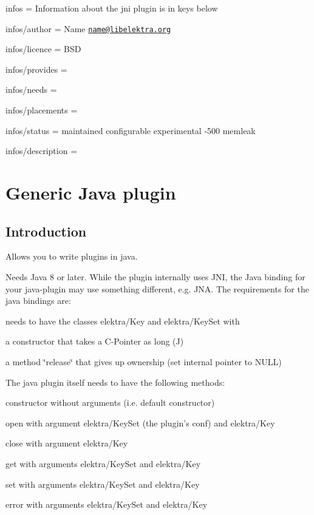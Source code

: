 
\begin{DoxyItemize}
\item infos = Information about the jni plugin is in keys below
\item infos/author = Name \href{mailto:name@libelektra.org}{\tt name@libelektra.\+org}
\item infos/licence = B\+S\+D
\item infos/provides =
\item infos/needs =
\item infos/placements =
\item infos/status = maintained configurable experimental -\/500 memleak
\item infos/description =
\end{DoxyItemize}\hypertarget{md_src_plugins_jni_README_src_plugins_jni_README_md}{}\section{Generic Java plugin}\label{md_src_plugins_jni_README_src_plugins_jni_README_md}
\subsection*{Introduction}

Allows you to write plugins in java.

Needs Java 8 or later. While the plugin internally uses J\+N\+I, the Java binding for your java-\/plugin may use something different, e.\+g. J\+N\+A. The requirements for the java bindings are\+:


\begin{DoxyItemize}
\item needs to have the classes elektra/\+Key and elektra/\+Key\+Set with
\begin{DoxyItemize}
\item a constructor that takes a C-\/\+Pointer as long (J)
\item a method \char`\"{}release\char`\"{} that gives up ownership (set internal pointer to N\+U\+L\+L)
\end{DoxyItemize}
\end{DoxyItemize}

The java plugin itself needs to have the following methods\+:


\begin{DoxyItemize}
\item constructor without arguments (i.\+e. default constructor)
\item open with argument elektra/\+Key\+Set (the plugin's conf) and elektra/\+Key
\item close with argument elektra/\+Key
\item get with arguments elektra/\+Key\+Set and elektra/\+Key
\item set with arguments elektra/\+Key\+Set and elektra/\+Key
\item error with arguments elektra/\+Key\+Set and elektra/\+Key
\end{DoxyItemize}

